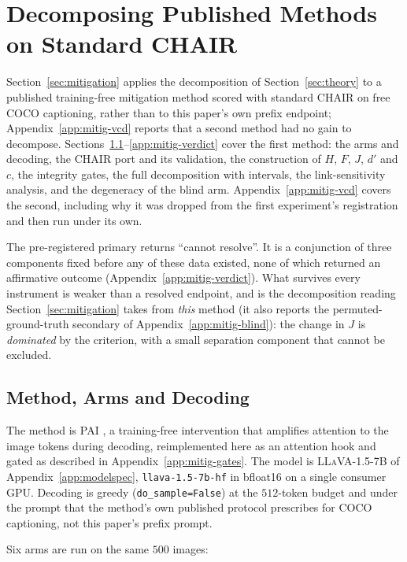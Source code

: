 \section{Decomposing Published Methods on Standard CHAIR}
\label{app:mitig}

Section~\ref{sec:mitigation} applies the decomposition of Section~\ref{sec:theory} to a published
training-free mitigation method scored with standard CHAIR on free COCO captioning, rather than to
this paper's own prefix endpoint; Appendix~\ref{app:mitig-vcd} reports that a second method had no gain
to decompose. Sections~\ref{app:mitig-arms}--\ref{app:mitig-verdict} cover the
first method: the arms and decoding, the CHAIR port and its validation, the construction of $H$, $F$,
$J$, $d'$ and $c$, the integrity gates, the full decomposition with intervals, the link-sensitivity
analysis, and the degeneracy of the blind arm. Appendix~\ref{app:mitig-vcd} covers the second,
including why it was dropped from the first experiment's registration and then run under its own.

The pre-registered primary returns ``cannot resolve''. It is a conjunction of three components
fixed before any of these data existed, none of which returned an affirmative outcome
(Appendix~\ref{app:mitig-verdict}). What survives every instrument is weaker than a resolved
endpoint, and is the decomposition reading Section~\ref{sec:mitigation} takes from \emph{this}
method (it also reports the permuted-ground-truth secondary of Appendix~\ref{app:mitig-blind}): the
change in $J$ is \emph{dominated} by the criterion, with a small separation component that cannot be
excluded.

\subsection{Method, Arms and Decoding}
\label{app:mitig-arms}

The method is PAI \citep{pai}, a training-free intervention that amplifies attention to the image
tokens during decoding, reimplemented here as an attention hook and gated as described in
Appendix~\ref{app:mitig-gates}. The model is \textsc{LLaVA-1.5-7B} of
Appendix~\ref{app:modelspec}, \texttt{llava-1.5-7b-hf} in bfloat16 on a single consumer GPU.
Decoding is greedy (\texttt{do\_sample=False}) at the $512$-token budget and under the prompt that
the method's own published protocol prescribes for COCO captioning, not this paper's prefix prompt.

Six arms are run on the same $500$ images:

